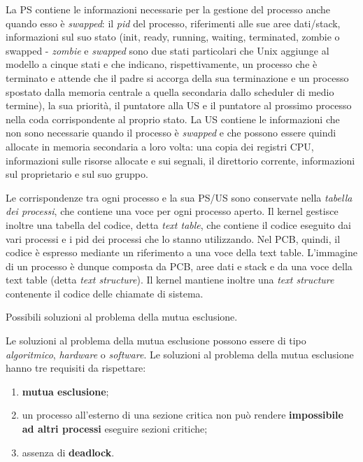 \documentclass[answers,a4paper,12pt]{exam}
\begin{document}
\begin{questions}
\begin{solutionorlines}[3.8in]
La PS contiene le informazioni necessarie per la gestione del processo anche quando esso è \textit{swapped}: il \textit{pid} del processo, riferimenti alle sue aree dati/stack, informazioni sul suo stato (init, ready, running, waiting, terminated, zombie o swapped - \textit{zombie} e \textit{swapped} sono due stati particolari che Unix aggiunge al modello a cinque stati e che indicano, rispettivamente, un processo che è terminato e attende che il padre si accorga della sua terminazione e un processo spostato dalla memoria centrale a quella secondaria dallo scheduler di medio termine), la sua priorità, il puntatore alla US e il puntatore al prossimo processo nella coda corrispondente al proprio stato. La US contiene le informazioni che non sono necessarie quando il processo è \textit{swapped} e che possono essere quindi allocate in memoria secondaria a loro volta: una copia dei registri CPU, informazioni sulle risorse allocate e sui segnali, il direttorio corrente, informazioni sul proprietario e sul suo gruppo. 

Le corrispondenze tra ogni processo e la sua PS/US sono conservate nella \textit{tabella dei processi}, che contiene una voce per ogni processo aperto. Il kernel gestisce inoltre una tabella del codice, detta \textit{text table}, che contiene il codice eseguito dai vari processi e i pid dei processi che lo stanno utilizzando. Nel PCB, quindi, il codice è espresso mediante un riferimento a una voce della text table. L'immagine di un processo è dunque composta da PCB, aree dati e stack e da una voce della text table (detta \textit{text structure}). Il kernel mantiene inoltre una \textit{text structure} contenente il codice delle chiamate di sistema. 
\end{solutionorlines}
\question
Possibili soluzioni al problema della mutua esclusione.
\begin{solutionorlines}[3.8in]
	Le soluzioni al problema della mutua esclusione possono essere di tipo \textit{algoritmico}, \textit{hardware} o \textit{software}. Le soluzioni al problema della mutua esclusione hanno tre requisiti da rispettare:
	\begin{enumerate}
	\item \textbf{mutua esclusione};
	\item un processo all'esterno di una sezione critica non può rendere \textbf{impossibile ad altri processi} eseguire sezioni critiche;
	\item assenza di \textbf{deadlock}.
	\end{enumerate}
	

\end{solutionorlines}
\end{questions}
\end{document}
